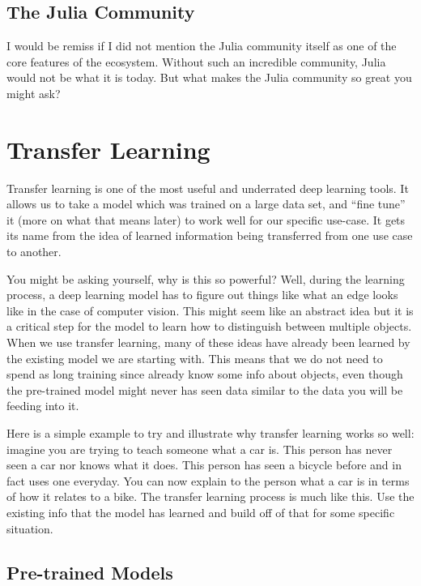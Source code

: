 \documentclass[
  notoc %
]{tufte-book}
\begin{document}
\hypertarget{sec:community}{%
\section{The Julia Community}\label{sec:community}}

I would be remiss if I did not mention the Julia community itself as one
of the core features of the ecosystem. Without such an incredible
community, Julia would not be what it is today. But what makes the Julia
community so great you might ask?

\hypertarget{sec:transfer_learning}{%
\chapter{Transfer Learning}\label{sec:transfer_learning}}

Transfer learning is one of the most useful and underrated deep learning
tools. It allows us to take a model which was trained on a large data
set, and ``fine tune'' it (more on what that means later) to work well
for our specific use-case. It gets its name from the idea of learned
information being transferred from one use case to another.

You might be asking yourself, why is this so powerful? Well, during the
learning process, a deep learning model has to figure out things like
what an edge looks like in the case of computer vision. This might seem
like an abstract idea but it is a critical step for the model to learn
how to distinguish between multiple objects. When we use transfer
learning, many of these ideas have already been learned by the existing
model we are starting with. This means that we do not need to spend as
long training since already know some info about objects, even though
the pre-trained model might never has seen data similar to the data you
will be feeding into it.

Here is a simple example to try and illustrate why transfer learning
works so well: imagine you are trying to teach someone what a car is.
This person has never seen a car nor knows what it does. This person has
seen a bicycle before and in fact uses one everyday. You can now explain
to the person what a car is in terms of how it relates to a bike. The
transfer learning process is much like this. Use the existing info that
the model has learned and build off of that for some specific situation.

\hypertarget{sec:pre-trained_models}{%
\section{Pre-trained Models}\label{sec:pre-trained_models}}
\end{document}

